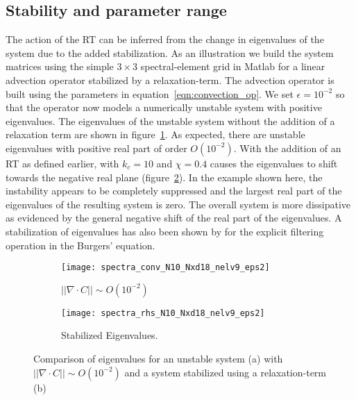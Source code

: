 \subsection{Stability and parameter range}
The action of the RT can be inferred from the change in eigenvalues of the system due to the added stabilization. As an illustration we build the system matrices using the simple $3\times3$ spectral-element grid in Matlab for a linear advection operator stabilized by a relaxation-term. The advection operator is built using the parameters in equation~\ref{eqn:convection_op}. We set $\epsilon=10^{-2}$ so that the operator now models a numerically unstable system with positive eigenvalues. The eigenvalues of the unstable system without the addition of a relaxation term are shown in figure~\ref{fig:spectra_conv_eps2}. As expected, there are unstable eigenvalues with positive real part of order $O(10^{-2})$. With the addition of an RT as defined earlier, with $k_{c}=10$ and $\chi=0.4$ causes the eigenvalues to shift towards the negative real plane (figure~\ref{fig:spectra_rhs_eps2}). In the example shown here, the instability appears to be completely suppressed and the largest real part of the eigenvalues of the resulting system is zero. The overall system is more dissipative as evidenced by the general negative shift of the real part of the eigenvalues. A stabilization of eigenvalues has also been shown by \cite{ohlsson11} for the explicit filtering operation in the Burgers' equation. 
\begin{figure}[h]
	\centering
	\begin{subfigure}[b]{0.49\textwidth}
		\centering
		\texttt{[image: spectra\_conv\_N10\_Nxd18\_nelv9\_eps2]}
		\caption{$||\nabla\cdot C|| \sim O(10^{-2})$}
		\label{fig:spectra_conv_eps2}
	\end{subfigure}
	\begin{subfigure}[b]{0.49\textwidth}
		\centering
		\texttt{[image: spectra\_rhs\_N10\_Nxd18\_nelv9\_eps2]}
		\caption{Stabilized Eigenvalues.}
		\label{fig:spectra_rhs_eps2}
	\end{subfigure}
	\caption{Comparison of eigenvalues for an unstable system (a) with $||\nabla\cdot C|| \sim O(10^{-2})$ and a system stabilized using a relaxation-term (b)}
	\label{fig:rt_spectra}
\end{figure}

